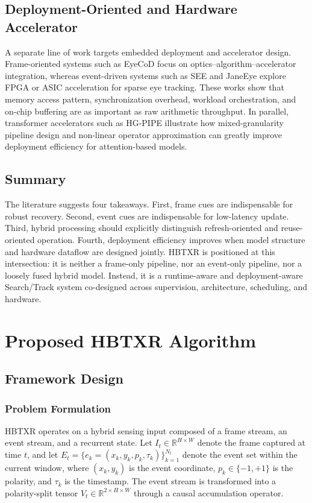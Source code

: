 \documentclass[journal]{IEEEtran}
\begin{document}
\subsection{Deployment-Oriented and Hardware Accelerator}
A separate line of work targets embedded deployment and accelerator design. Frame-oriented systems such as EyeCoD focus on optics--algorithm--accelerator integration, whereas event-driven systems such as SEE and JaneEye explore FPGA or ASIC acceleration for sparse eye tracking. These works show that memory access pattern, synchronization overhead, workload orchestration, and on-chip buffering are as important as raw arithmetic throughput. In parallel, transformer accelerators such as HG-PIPE illustrate how mixed-granularity pipeline design and non-linear operator approximation can greatly improve deployment efficiency for attention-based models.

\subsection{Summary}
The literature suggests four takeaways. First, frame cues are indispensable for robust recovery. Second, event cues are indispensable for low-latency update. Third, hybrid processing should explicitly distinguish refresh-oriented and reuse-oriented operation. Fourth, deployment efficiency improves when model structure and hardware dataflow are designed jointly. HBTXR is positioned at this intersection: it is neither a frame-only pipeline, nor an event-only pipeline, nor a loosely fused hybrid model. Instead, it is a runtime-aware and deployment-aware Search/Track system co-designed across supervision, architecture, scheduling, and hardware.

\section{Proposed HBTXR Algorithm}
\subsection{Framework Design}
\subsubsection{Problem Formulation}
HBTXR operates on a hybrid sensing input composed of a frame stream, an event stream, and a recurrent state. Let $I_t \in \mathbb{R}^{H\times W}$ denote the frame captured at time $t$, and let $E_t = \{e_k=(x_k,y_k,p_k,\tau_k)\}_{k=1}^{N_t}$ denote the event set within the current window, where $(x_k,y_k)$ is the event coordinate, $p_k \in \{-1,+1\}$ is the polarity, and $\tau_k$ is the timestamp. The event stream is transformed into a polarity-split tensor $V_t \in \mathbb{R}^{2\times H\times W}$ through a causal accumulation operator.
\end{document}
